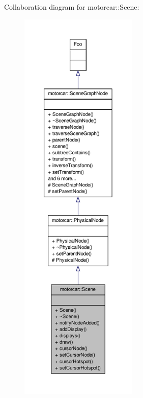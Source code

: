 Collaboration diagram for motorcar\-:\-:Scene\-:
\nopagebreak
\begin{figure}[H]
\begin{center}
\leavevmode
\includegraphics[height=550pt]{classmotorcar_1_1Scene__coll__graph}
\end{center}
\end{figure}

